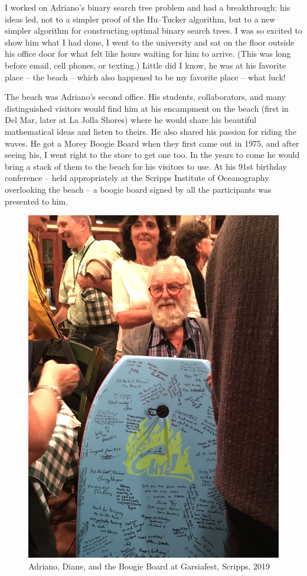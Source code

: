 \documentclass{notices}
\begin{document}
I worked on Adriano's binary search tree problem and had a breakthrough:  his ideas led, not to a simpler proof of the Hu--Tucker algorithm, but  to a  new simpler algorithm for constructing optimal binary search trees. 
I was so excited to show him what I had done, I went to the university and sat on the floor outside his office door for what felt like hours waiting  for him to arrive. (This was long before email, cell phones, or texting.)  Little did I know, he was at his favorite place -- the beach -- which also happened to be my favorite place -- what luck!

The beach was Adriano's second office. 
His students, collaborators, and many distinguished visitors would find him at his  encampment on the beach (first in Del Mar, later at La Jolla Shores) where he would share his beautiful mathematical ideas and listen to theirs. He also shared his passion for riding the waves.
He got a Morey Boogie Board when they first came out in 1975, and after seeing his, I went right to the store to get one too. In the years to come he would bring a stack of them to the beach for his visitors to use.
  At his 91st birthday conference -- held appropriately at the Scripps Institute of Oceanography overlooking the beach -- a boogie board signed by all the participants was presented to him.
  \begin{figure}
    \centering
    \includegraphics[width=0.95\linewidth]{Michelle_Wachs/IMG_4082.jpeg} 
 {\footnotesize Adriano, Diane, and the Boogie Board at Garsiafest, Scripps, 2019}
\end{figure}
\end{document}
